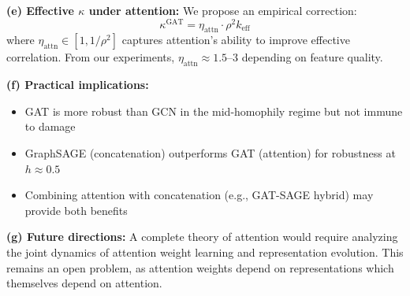 \begin{remark}
\textbf{(e) Effective $\kappa$ under attention:}
We propose an empirical correction:
\begin{equation}
    \kappa^{\text{GAT}} = \eta_{\text{attn}} \cdot \rho^2 k_{\mathrm{eff}}
\end{equation}
where $\eta_{\text{attn}} \in [1, 1/\rho^2]$ captures attention's ability to improve effective correlation. From our experiments, $\eta_{\text{attn}} \approx 1.5$--$3$ depending on feature quality.

\textbf{(f) Practical implications:}
\begin{itemize}
    \item GAT is more robust than GCN in the mid-homophily regime but not immune to damage
    \item GraphSAGE (concatenation) outperforms GAT (attention) for robustness at $h \approx 0.5$
    \item Combining attention with concatenation (e.g., GAT-SAGE hybrid) may provide both benefits
\end{itemize}

\textbf{(g) Future directions:}
A complete theory of attention would require analyzing the joint dynamics of attention weight learning and representation evolution. This remains an open problem, as attention weights depend on representations which themselves depend on attention.
\end{remark}

